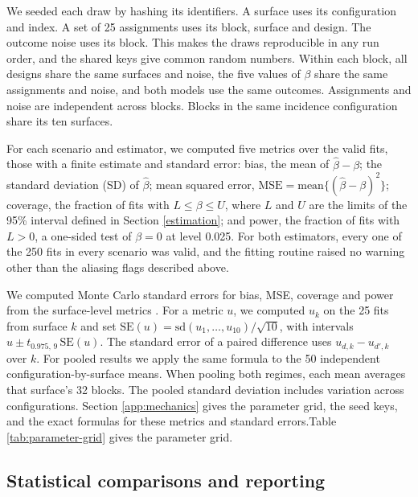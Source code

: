 \documentclass[11pt]{article}
\begin{document}
We seeded each draw by hashing its identifiers. A surface uses its
configuration and index. A set of 25 assignments uses its block,
surface and design. The outcome noise uses its block. This makes the
draws reproducible in any run order, and the shared keys give common
random numbers. Within each block, all designs share the same surfaces
and noise, the five values of \(\beta\) share the same assignments and
noise, and both models use the same outcomes. Assignments and noise are
independent across blocks. Blocks in the same incidence configuration
share its ten surfaces.

For each scenario and estimator, we computed five metrics over the valid
fits, those with a finite estimate and standard error: bias, the mean of
\(\hat\beta - \beta\); the standard deviation (SD) of \(\hat\beta\); mean
squared error, \(\text{MSE} = \text{mean}\{(\hat\beta - \beta)^2\}\);
coverage, the fraction of fits with \(L \le \beta \le U\), where \(L\) and \(U\) are the limits of the 95\% interval defined in Section \ref{estimation}; and power, the
fraction of fits with \(L > 0\), a one-sided test of \(\beta = 0\) at
level 0.025. For both estimators, every one of the 250 fits in every
scenario was valid, and the fitting routine raised no warning other than
the aliasing flags described above.

We computed Monte Carlo standard errors for bias, MSE, coverage and
power from the surface-level metrics \citep{morris_using_2019}. For a
metric \(u\), we computed \(u_k\) on the 25 fits from surface \(k\) and
set \(\text{SE}(u) = \text{sd}(u_1,\dots,u_{10})/\sqrt{10}\), with
intervals \(u \pm t_{0.975,\,9}\,\text{SE}(u)\). The standard error of
a paired difference uses \(u_{d,k}-u_{d',k}\) over \(k\). For pooled
results we apply the same formula to the 50 independent
configuration-by-surface means. When pooling both regimes, each mean
averages that surface's 32 blocks. The pooled standard deviation
includes variation across configurations. \iffullsi Section
\ref{app:mechanics} gives the parameter grid, the seed keys, and the
exact formulas for these metrics and standard errors.\else Table \ref{tab:parameter-grid} gives the parameter grid.\fi


\subsection{Statistical comparisons and reporting}\label{statistical-comparison-methods}
\end{document}
